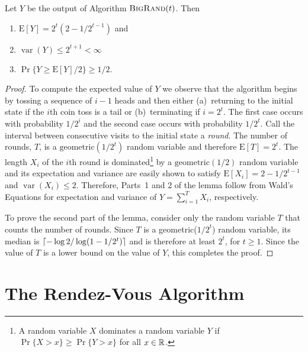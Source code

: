 \documentclass[lotsofwhite]{patmorin}
\newcommand{\bigrand}{\textsc{BigRand}}
\newcommand{\E}{\mathrm{E}}
\DeclareMathOperator{\var}{var}
\begin{document}
\begin{lem}
Let $Y$ be the output of Algorithm $\bigrand(t)$.  Then 
\begin{enumerate}
\item $\E[Y]=2^t(2-1/2^{t-1})$ and
\item $\var(Y) \le 2^{t+1} < \infty$
\item $\Pr\{Y \ge \E[Y] / 2\} \ge 1/2$.
\end{enumerate}
\end{lem}

\begin{proof}
To compute the expected value of $Y$ we observe that the algorithm
begins by tossing a sequence of $i-1$ heads and then either
(a)~returning to the initial state if the $i$th coin toss is a tail or
(b)~terminating if $i=2^t$.  The first case occurs with probability
$1/2^i$ and the second case occurs with probability $1/2^t$.  Call the
interval between consecutive visits to the initial state a
\emph{round}.  The number of rounds, $T$, is a
$\mathrm{geometric}(1/2^t)$ random variable and therefore $\E[T] =
2^t$.  The length $X_i$ of the $i$th round is dominated\footnote{A random
variable $X$ dominates a random variable $Y$ if $\Pr\{X > x\}\ge
\Pr\{Y > x\}$ for all $x\in\mathbb{R}$.} by a
$\mathrm{geometric}(1/2)$ random variable and its expectation and
variance are easily shown to satisfy
$\E[X_i]=2-1/2^{t-1}$ and $\var(X_i) \le 2$.  Therefore, Parts~1 and
2 of the lemma follow from Wald's Equations for expectation and
variance of $Y=\sum_{i=1}^T X_i$, respectively.


To prove the second part of the lemma, consider only the random
variable $T$ that counts the number of rounds.  Since $T$ is a
geometric($1/2^t$) random variable, its median is $\left\lceil -
\log 2/\log(1-1/2^t) \right\rceil$ and is therefore at least $2^t$, for $t \ge 1$.
Since the value of $T$ is a lower bound on the value of $Y$, this
completes the proof.
\end{proof}

\section{The Rendez-Vous Algorithm}
\end{document}
